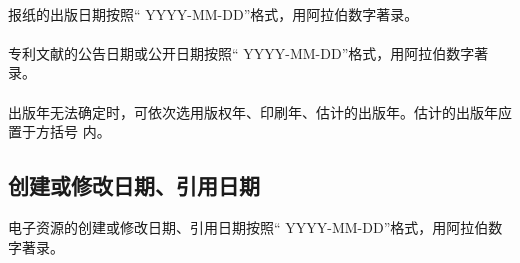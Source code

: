 \documentclass{article}
\begin{document}
\begin{refsection}
\nocite{egbookpubdatea--}
\nocite{egbookpubdateb--}

{}
\end{refsection}

\paragraph{} 报纸的出版日期按照“ YYYY-MM-DD”格式，用阿拉伯数字著录。


\begin{refsection}
\nocite{egbookpubdatec--}

{}
\end{refsection}

\paragraph{} 专利文献的公告日期或公开日期按照“ YYYY-MM-DD”格式，用阿拉伯数字著录。

\begin{refsection}
\nocite{egbookpubdateh--}

{}
\end{refsection}

\paragraph{} 出版年无法确定时，可依次选用版权年、印刷年、估计的出版年。估计的出版年应置于方括号
内。

\begin{refsection}

\nocite{egbookpubdated--}
\nocite{egbookpubdatee--}
\nocite{egbookpubdatef--}

{}
\end{refsection}




\subsection{创建或修改日期、引用日期}

电子资源的创建或修改日期、引用日期按照“ YYYY-MM-DD”格式，用阿拉伯数字著录。
\begin{refsection}
\nocite{egbookpubdateg--}

{}
\end{refsection}
\end{document}
